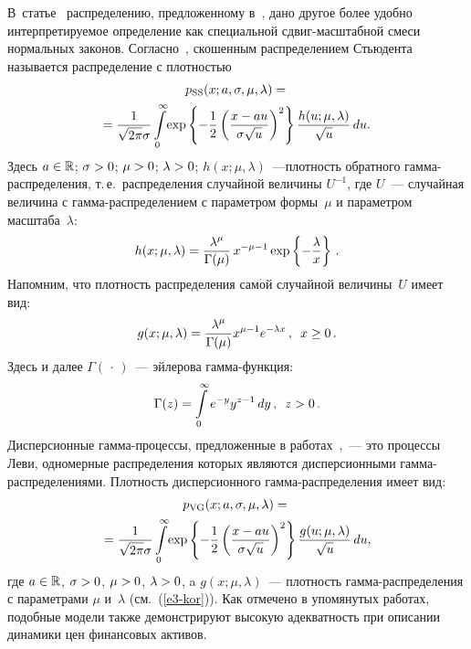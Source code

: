 \begin{multicols}{2}
В~статье~\cite{KimMcCulloch2007} 
распределению, предложенному в~\cite{AasHaff2006}, дано другое более удобно ин\-тер\-пре\-ти\-ру\-емое
определение как специальной сдвиг-мас\-штаб\-ной смеси нормальных
законов. Согласно~\cite{KimMcCulloch2007}, скошенным
распределением Стьюдента называется распределение с плот\-ностью
\begin{multline}
p_{\mathrm{SS}}(x;a,\sigma,\mu,\lambda)={}\\
\hspace*{-2mm}{}=\fr{1}{\sqrt{2\pi}\sigma}\int\limits_{0}^{\infty}\!
\exp\left\{-\fr{1}{2}\left(\fr{x-a u}{\sigma\sqrt{u}}\right)^2\right\}
\fr{h(u;\mu,\lambda)}{\sqrt{u}}\,du.\!\label{e1-kor}
\end{multline}
Здесь $a\in\mathbb{R}$; $\sigma\hm>0$; $\mu\hm>0$; $\lambda\hm>0$;
$h(x;\mu,\lambda)$~---плотность обратного гам\-ма-рас\-пре\-де\-ле\-ния, т.\,е.\ распределения
случайной величины $U^{-1}$, где $U$~--- случайная величина с
гам\-ма-рас\-пре\-де\-ле\-ни\-ем с параметром формы~$\mu$ и параметром
масштаба~$\lambda$:
\begin{equation}
h(x;\mu,\lambda)= \displaystyle\frac{\displaystyle \lambda^\mu\mathstrut}{\displaystyle \Gamma(\mu)\mathstrut}\,x^{-\mu-1}\exp
\left\{-\displaystyle\frac{\displaystyle \lambda\mathstrut}{\displaystyle x\mathstrut}\right\}\,.\label{e2-kor}
\end{equation}
 Напомним, что плот\-ность распределения
сам$\acute{\mbox{о}}$й случайной величины~$U$ имеет вид:
\begin{equation}
g(x;\mu,\lambda)=\displaystyle\frac{\displaystyle \lambda^{\mu}\mathstrut}{\displaystyle \Gamma(\mu)\mathstrut}x^{\mu-1}e^{-\lambda
x}\,,\enskip x\ge0\,.\label{e3-kor}
\end{equation}
Здесь и далее $\Gamma(\,\cdot\,)$~--- эйлерова гам\-ма-функ\-ция:
$$
\Gamma(z) = \int\limits_{0}^{\infty}e^{-y}y^{z-1}\,dy\,,\enskip z>0\,.
$$
Дисперсионные гамма-про\-цес\-сы, предложенные в 
работах~\cite{MadanSeneta1990, CarrMadanChang1998},~--- это процессы Леви,
одномерные распределения которых являются дисперсионными
гам\-ма-рас\-пре\-де\-ле\-ни\-ями. Плотность дисперсионного
гам\-ма-рас\-пре\-де\-ле\-ния имеет вид:
\begin{multline}
p_{\mathrm{VG}}(x;a,\sigma,\mu,\lambda)={}\\
\!\!{}=\displaystyle\frac{\displaystyle 1\mathstrut}{\displaystyle \sqrt{2\pi}\sigma\mathstrut}
\int\limits_{0}^{\infty}\!\exp\left\{-\displaystyle\frac{\displaystyle 1\mathstrut}{\displaystyle 2\mathstrut}\left(\displaystyle\frac{\displaystyle x-au\mathstrut}{\displaystyle \sigma\sqrt{u}\mathstrut}\right)^2\right\}
\displaystyle\frac{\displaystyle g(u;\mu,\lambda)\mathstrut}{\displaystyle \sqrt{u}\mathstrut}\,du,\!\label{e4-kor}
\end{multline}
где $a\in\mathbb{R}$, $\sigma\hm>0$, $\mu\hm>0$, $\lambda\hm>0$, a
$g(x;\mu,\lambda)$~--- плот\-ность гам\-ма-рас\-пре\-де\-ле\-ния с параметрами
$\mu$ и~$\lambda$ (см.~(\ref{e3-kor})). Как отмечено в упомянутых работах,
подобные модели также демонстрируют высокую адекватность при
описании динамики цен финансовых активов.


\end{multicols}
